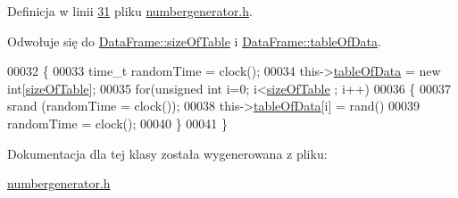 Definicja w linii \hyperlink{numbergenerator_8h_source_l00031}{31} pliku \hyperlink{numbergenerator_8h_source}{numbergenerator.\-h}.



Odwołuje się do \hyperlink{dataframe_8h_source_l00034}{Data\-Frame\-::size\-Of\-Table} i \hyperlink{dataframe_8h_source_l00021}{Data\-Frame\-::table\-Of\-Data}.


\begin{DoxyCode}
00032 \{
00033         time\_t randomTime = clock();
00034         this->\hyperlink{class_data_frame_a8edc4ce524483e2e5069067267ccdcbf}{tableOfData} = \textcolor{keyword}{new} \textcolor{keywordtype}{int}[\hyperlink{class_data_frame_aa5d1905c6910cad07ab5189bd34b13ab}{sizeOfTable}];
00035         \textcolor{keywordflow}{for}(\textcolor{keywordtype}{unsigned} \textcolor{keywordtype}{int} i=0; i<\hyperlink{class_data_frame_aa5d1905c6910cad07ab5189bd34b13ab}{sizeOfTable} ; i++)
00036         \{
00037                 srand (randomTime = clock());
00038                 this->\hyperlink{class_data_frame_a8edc4ce524483e2e5069067267ccdcbf}{tableOfData}[i] = rand()%
00039                 randomTime = clock();
00040         \}
00041 \}
\end{DoxyCode}


Dokumentacja dla tej klasy została wygenerowana z pliku\-:\begin{DoxyCompactItemize}
\item 
\hyperlink{numbergenerator_8h}{numbergenerator.\-h}\end{DoxyCompactItemize}
